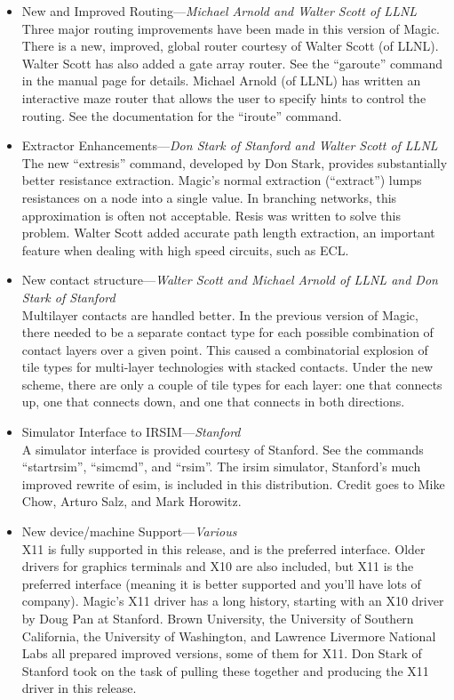 \documentclass[letterpaper,twoside,12pt]{article}
\begin{document}
\begin{itemize}
\item New and Improved Routing---{\itshape Michael Arnold and
	Walter Scott of LLNL} \\
Three major routing improvements have been made in this version of Magic.
There is a new, improved, global router courtesy of Walter Scott (of LLNL).
Walter Scott has also added a gate array router.  See the ``garoute'' command
in the manual page for details.
Michael Arnold (of LLNL) has written an interactive maze router that allows
the user to specify hints to control the routing.  See the documentation
for the ``iroute'' command.

\item Extractor Enhancements---{\itshape Don Stark of Stanford and
	Walter Scott of LLNL} \\
The new ``extresis'' command, developed by Don Stark, provides
substantially better resistance extraction.  Magic's
normal extraction (``extract'') lumps resistances on a 
node into a single value.  
In branching networks, this approximation is often not acceptable.
Resis was written to solve this problem.  Walter Scott added accurate path
length extraction, an important feature when dealing with high speed
circuits, such as ECL.

\item New contact structure---{\itshape  Walter Scott and
	Michael Arnold of LLNL and Don Stark of Stanford} \\
Multilayer contacts are handled better.
In the previous version of Magic, there needed to be a separate contact type
for each possible combination of contact layers over a given point.  This
caused a combinatorial explosion of tile types for multi-layer technologies
with stacked contacts.  Under the new scheme, there are only a couple of
tile types for each layer:  one that connects up, one that connects down,
and one that connects in both directions.

\item Simulator Interface to IRSIM---{\itshape Stanford} \\
A simulator interface is provided courtesy of Stanford.  
See the commands ``startrsim'', ``simcmd'', and ``rsim''.
The irsim simulator, Stanford's much improved rewrite of esim, is included 
in this distribution.
Credit goes to Mike Chow, Arturo Salz, and Mark Horowitz.

\item New device/machine Support---{\itshape Various} \\
X11 is fully supported in this release, and is the preferred interface.  Older
drivers for graphics terminals and X10 are also included, but X11 is the
preferred interface (meaning it is better supported and you'll have lots of
company).  Magic's X11 driver has a long history, starting with an X10 driver
by Doug Pan at Stanford.  Brown University, the University of 
Southern California, the University of Washington, and Lawrence Livermore
National Labs all prepared improved versions, some of them for X11.  Don
Stark of Stanford took on the task of pulling these together and producing
the X11 driver in this release.


\end{itemize}
\end{document}
